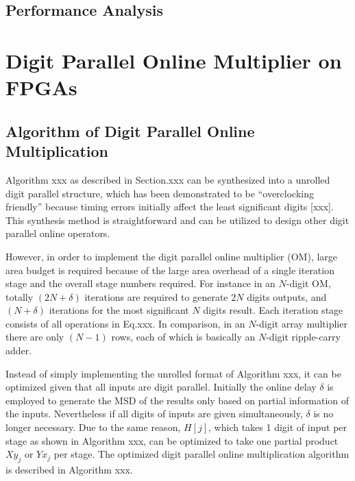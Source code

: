 \documentclass[conference]{IEEEtran}
\begin{document}
\subsection{Performance Analysis}


\section{Digit Parallel Online Multiplier on FPGAs}\label{Sec:OM_FPGA}
\subsection{Algorithm of Digit Parallel Online Multiplication}
Algorithm xxx as described in Section.xxx can be synthesized into a unrolled digit parallel structure, which has been demonstrated to be ``overclocking friendly'' because timing errors initially affect the least significant digits [xxx]. This synthesis method is straightforward and can be utilized to design other digit parallel online operators. 

However, in order to implement the digit parallel online multiplier (OM), large area budget is required because of the large area overhead of a single iteration stage and the overall stage numbers required. For instance in an $N$-digit OM, totally $(2N+\delta)$ iterations are required to generate $2N$ digits outputs, and $(N+\delta)$ iterations for the most significant $N$ digits result. Each iteration stage consists of all operations in Eq.xxx. In comparison, in an $N$-digit array multiplier there are only $(N-1)$ rows, each of which is basically an $N$-digit ripple-carry adder. 

Instead of simply implementing the unrolled format of Algorithm xxx, it can be optimized given that all inputs are digit parallel. Initially the online delay $\delta$ is employed to generate the MSD of the results only based on partial information of the inputs. Nevertheless if all digits of inputs are given simultaneously, $\delta$ is no longer necessary. Due to the same reason, $H[j]$, which takes 1 digit of input per stage as shown in Algorithm xxx, can be optimized to take one partial product $Xy_j$ or $Yx_j$ per stage. The optimized digit parallel online multiplication algorithm is described in Algorithm xxx.
\end{document}
